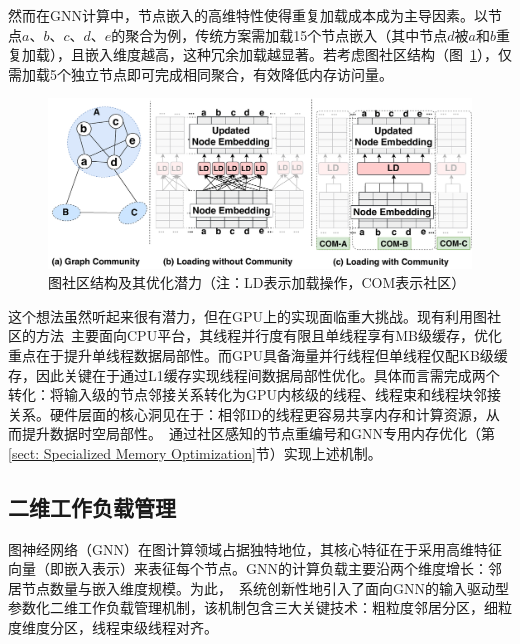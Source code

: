 然而在GNN计算中，节点嵌入的高维特性使得重复加载成本成为主导因素。以节点$a$、$b$、$c$、$d$、$e$的聚合为例，传统方案需加载15个节点嵌入（其中节点$d$被$a$和$b$重复加载），且嵌入维度越高，这种冗余加载越显著。若考虑图社区结构（图~\ref{fig: Graph-community}），仅需加载5个独立节点即可完成相同聚合，有效降低内存访问量。

\begin{figure} [t]
    \centering
    \includegraphics[width=0.98\columnwidth]{images/graph_community-1.pdf}
    \caption{图社区结构及其优化潜力（注：LD表示加载操作，COM表示社区）}
    \label{fig: Graph-community}
    \vspace{-0pt}
\end{figure}

这个想法虽然听起来很有潜力，但在GPU上的实现面临重大挑战。现有利用图社区的方法~\cite{hendrickson2000graph, newman2013spectral}主要面向CPU平台，其线程并行度有限且单线程享有MB级缓存，优化重点在于提升单线程数据局部性。而GPU具备海量并行线程但单线程仅配KB级缓存，因此关键在于通过L1缓存实现线程间数据局部性优化。具体而言需完成两个转化：将输入级的节点邻接关系转化为GPU内核级的线程、线程束和线程块邻接关系。硬件层面的核心洞见在于：相邻ID的线程更容易共享内存和计算资源，从而提升数据时空局部性。~\Mname{}通过社区感知的节点重编号和GNN专用内存优化（第\ref{sect: Specialized Memory Optimization}节）实现上述机制。
\subsection{二维工作负载管理}
\label{sect: 2D Workload Management}
图神经网络（GNN）在图计算领域占据独特地位，其核心特征在于采用高维特征向量（即嵌入表示）来表征每个节点。GNN的计算负载主要沿两个维度增长：邻居节点数量与嵌入维度规模。为此，~\Mname{}系统创新性地引入了面向GNN的输入驱动型参数化二维工作负载管理机制，该机制包含三大关键技术：粗粒度邻居分区，细粒度维度分区，线程束级线程对齐。
